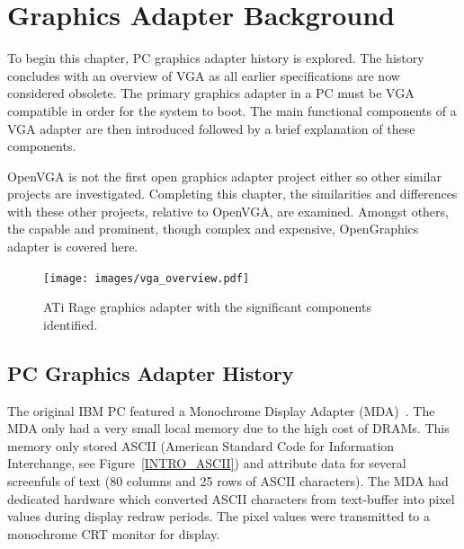\chapter{Graphics Adapter Background}
\label{BACKGROUND}

To begin this chapter, PC graphics adapter history is explored. The history
concludes with an overview of VGA as all earlier specifications are now
considered obsolete. The primary graphics adapter in a PC must be VGA compatible
in order for the system to boot. The main functional components of a VGA adapter
are then introduced followed by a brief explanation of these components.

OpenVGA is not the first open graphics adapter project either so other
similar projects are investigated. Completing this chapter, the similarities and
differences with these other projects, relative to OpenVGA, are examined. Amongst
others, the capable and prominent, though complex and expensive, OpenGraphics
adapter is covered here.


\begin{figure}[h!]
\begin{center}
\texttt{[image: images/vga\_overview.pdf]}
\caption[ATi Rage graphics adpater]{ATi Rage graphics adapter with the
significant components identified.}
\end{center}
\label{INTRO_ATi_Rage}
\end{figure}


\section{PC Graphics Adapter History}
The original IBM PC featured a Monochrome Display Adapter (MDA)~\cite{VGA_Programmers}. The MDA
only had a very small local memory due to the high cost of DRAMs. This memory
only stored ASCII (American Standard Code for Information
Interchange, see Figure~\ref{INTRO_ASCII}) and attribute data for
several screenfuls of text (80 columns and 25 rows of ASCII characters). The MDA
had dedicated hardware which converted ASCII characters from text-buffer into
pixel values during display redraw periods. The pixel values were transmitted to
a monochrome CRT monitor for
display.

